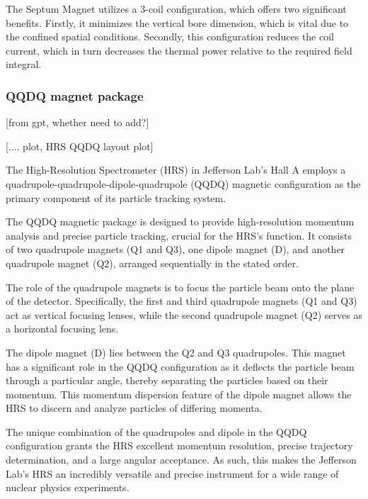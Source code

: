 The Septum Magnet utilizes a 3-coil configuration, which offers two significant benefits. Firstly, it minimizes the vertical bore dimension, which is vital due to the confined spatial conditions. Secondly, this configuration reduces the coil current, which in turn decreases the thermal power relative to the required field integral. 


\subsubsection{QQDQ magnet package}

[from gpt, whether need to add?]

[.... plot, HRS QQDQ layout plot]

The High-Resolution Spectrometer (HRS) in Jefferson Lab's Hall A employs a quadrupole-quadrupole-dipole-quadrupole (QQDQ) magnetic configuration as the primary component of its particle tracking system.

The QQDQ magnetic package is designed to provide high-resolution momentum analysis and precise particle tracking, crucial for the HRS's function. It consists of two quadrupole magnets (Q1 and Q3), one dipole magnet (D), and another quadrupole magnet (Q2), arranged sequentially in the stated order.

The role of the quadrupole magnets is to focus the particle beam onto the plane of the detector. Specifically, the first and third quadrupole magnets (Q1 and Q3) act as vertical focusing lenses, while the second quadrupole magnet (Q2) serves as a horizontal focusing lens.

The dipole magnet (D) lies between the Q2 and Q3 quadrupoles. This magnet has a significant role in the QQDQ configuration as it deflects the particle beam through a particular angle, thereby separating the particles based on their momentum. This momentum dispersion feature of the dipole magnet allows the HRS to discern and analyze particles of differing momenta.

The unique combination of the quadrupoles and dipole in the QQDQ configuration grants the HRS excellent momentum resolution, precise trajectory determination, and a large angular acceptance. As such, this makes the Jefferson Lab's HRS an incredibly versatile and precise instrument for a wide range of nuclear physics experiments.

